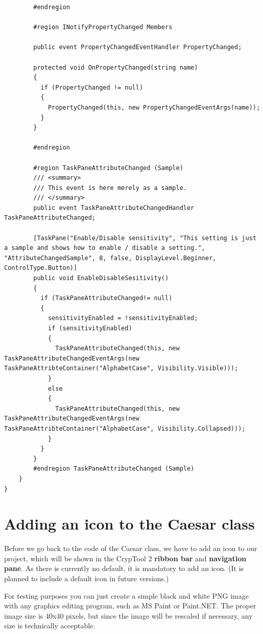 \begin{lstlisting}
        #endregion

        #region INotifyPropertyChanged Members

        public event PropertyChangedEventHandler PropertyChanged;

        protected void OnPropertyChanged(string name)
        {
          if (PropertyChanged != null)
          {
            PropertyChanged(this, new PropertyChangedEventArgs(name));
          }
        }

        #endregion

        #region TaskPaneAttributeChanged (Sample)
        /// <summary>
        /// This event is here merely as a sample.
        /// </summary>
        public event TaskPaneAttributeChangedHandler TaskPaneAttributeChanged;

        [TaskPane("Enable/Disable sensitivity", "This setting is just a sample and shows how to enable / disable a setting.", "AttributeChangedSample", 8, false, DisplayLevel.Beginner, ControlType.Button)]
        public void EnableDisableSesitivity()
        {
          if (TaskPaneAttributeChanged!= null)
          {
            sensitivityEnabled = !sensitivityEnabled;
            if (sensitivityEnabled)
            {
              TaskPaneAttributeChanged(this, new TaskPaneAttributeChangedEventArgs(new TaskPaneAttribteContainer("AlphabetCase", Visibility.Visible)));
            }
            else
            {
              TaskPaneAttributeChanged(this, new TaskPaneAttributeChangedEventArgs(new TaskPaneAttribteContainer("AlphabetCase", Visibility.Collapsed)));
            }
          }
        }
        #endregion TaskPaneAttributeChanged (Sample)
    }
}
\end{lstlisting}
\clearpage

\section{Adding an icon to the Caesar class}
\label{sec:AddingAnIconToTheCaesarClass}

Before we go back to the code of the Caesar class, we have to add an icon to our project, which will be shown in the CrypTool 2 \textbf{ribbon bar} and \textbf{navigation pane}. As there is currently no default, it is mandatory to add an icon. (It is planned to include a default icon in future versions.)

For testing purposes you can just create a simple black and white PNG image with any graphics editing program, such as MS Paint or Paint.NET. The proper image size is 40x40 pixels, but since the image will be rescaled if necessary, any size is technically acceptable.

